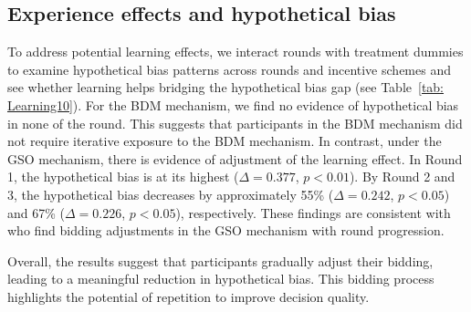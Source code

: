 \documentclass[12pt]{article}
\begin{document}
\subsection{Experience effects and hypothetical bias}
\label{Sec: learning}
To address potential learning effects, we interact rounds with treatment dummies to examine hypothetical bias patterns across rounds and incentive schemes and see whether learning helps bridging the hypothetical bias gap (see Table~\ref{tab: Learning10}). For the BDM mechanism, we find no evidence of hypothetical bias in none of the round. This suggests that participants in the BDM mechanism did not require iterative exposure to the BDM mechanism. 
In contrast, under the GSO mechanism, there is evidence of adjustment of the learning effect. In Round 1, the hypothetical bias is at its highest (\(\Delta = 0.377\), \(p < 0.01\)). By Round 2 and 3, the hypothetical bias decreases by approximately 55\% (\(\Delta = 0.242\), \(p < 0.05\)) and 67\% (\(\Delta = 0.226\), \(p < 0.05\)), respectively. These findings are consistent with \citet{brown_is_2023} who find bidding adjustments in the GSO mechanism with round progression. 

Overall, the results suggest that participants gradually adjust their bidding, leading to a meaningful reduction in hypothetical bias. This bidding process highlights the potential of repetition to improve decision quality. 
\end{document}
